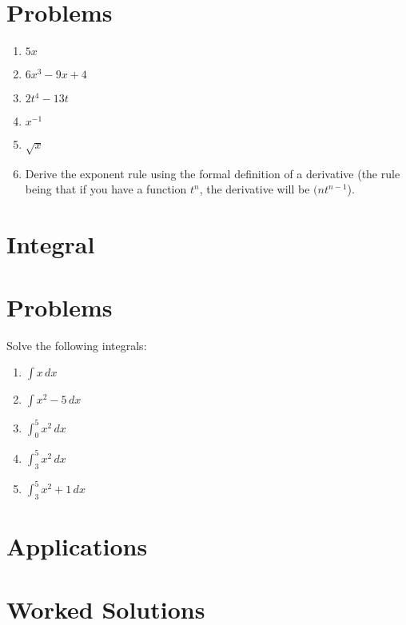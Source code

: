 \documentclass[12pt]{article}
\begin{document}
\section{Problems}
\begin{enumerate}
    \item $5x$
    \item $6x^3 - 9x + 4$
    \item $2t^4 - 13t$
    \item $x^{-1}$
    \item $\sqrt{x}$
    \item Derive the exponent rule using the formal definition of a derivative (the rule being that if you have a function $t^n$, the derivative will be $(nt^{n-1}$).
\end{enumerate}

\section{Integral}



\section{Problems}
Solve the following integrals:

\begin{enumerate}
    \item $\int x \, dx$
    \item $\int x^2-5 \, dx$
    \item $\int^5_0 x^2 \, dx$
    \item $\int^5_3 x^2 \, dx$
    \item $\int^5_3 x^2 + 1 \, dx$
\end{enumerate}

\section{Applications}



\medskip

\section{Worked Solutions}




\end{document}
